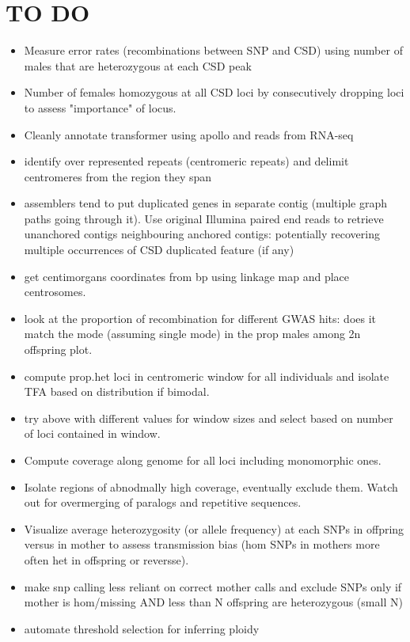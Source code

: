 \documentclass[10pt,a4paper]{report}
\begin{document}
\chapter{TO DO}
\begin{itemize}
\item Measure error rates (recombinations between SNP and CSD) using number of males that are heterozygous at each CSD peak
\item Number of females homozygous at all CSD loci by consecutively dropping loci to assess "importance" of locus.
\item Cleanly annotate transformer using apollo and reads from RNA-seq
\item identify over represented repeats (centromeric repeats) and delimit centromeres from the region they span
\item assemblers tend to put duplicated genes in separate contig (multiple graph paths going through it). Use original Illumina paired end reads to retrieve unanchored contigs neighbouring anchored contigs: potentially recovering multiple occurrences of CSD duplicated feature (if any)
\item get centimorgans coordinates from bp using linkage map and place centrosomes.
\item look at the proportion of recombination for different GWAS hits: does it match the mode (assuming single mode) in the prop males among 2n offspring plot.
\item compute prop.het loci in centromeric window for all individuals and isolate TFA based on distribution if bimodal.
\item try above with different values for window sizes and select based on number of loci contained in window.
\item Compute coverage along genome for all loci including monomorphic ones.
\item Isolate regions of abnodmally high coverage, eventually exclude them. Watch out for overmerging of paralogs and repetitive sequences.
\item Visualize average heterozygosity (or allele frequency) at each SNPs in offpring versus in mother to assess transmission bias (hom SNPs in mothers more often het in offspring or reversse). 
\item make snp calling less reliant on correct mother calls and exclude SNPs only if mother is hom/missing AND less than N offspring are heterozygous (small N)
\item automate threshold selection for inferring ploidy
\end{itemize}
\end{document}
